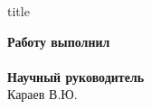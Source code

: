 {
\begin{frame}[noframenumbering]
	\begin{center}
		\small\textsc {\insertinstitute}
		\vspace{1cm}
	\end{center}
		\begin{beamercolorbox}[sep=8pt,center]{title}
			\inserttitle
		\end{beamercolorbox}
		\vspace{0.1cm}
	\begin{flushright}
		\normalsize \textbf{Работу выполнил}\\
		\large
		\insertauthor \\
		\vspace{0.5cm}
		\normalsize{\textbf{Научный руководитель}\\}
		\large{Караев В.Ю.}
		\vfill
	\end{flushright}

	\centering{\small{\today }}
	
\end{frame}}